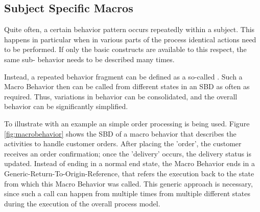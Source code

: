 


\subsection{Subject Specific Macros}

Quite often, a certain behavior pattern occurs repeatedly within a subject. This happens in particular when in various parts of the process identical actions need to be performed. If only the basic constructs are available to this respect, the same sub- behavior needs to be described many times.

Instead, a repeated behavior fragment can be defined as a so-called . Such a Macro Behavior then can be called from different states in an SBD as often as required. Thus, variations in behavior can be consolidated, and the overall behavior can be significantly simplified.

To illustrate with an example an simple order processing is being used. Figure \ref{fig:macrobehavior} shows the SBD of a macro behavior that describes the activities to handle customer orders. After placing the 'order', the customer receives an order confirmation; once the 'delivery' occurs, the delivery status is updated. Instead of ending in a normal end state, the Macro Behavior ends in a Generic-Return-To-Origin-Reference, that refers the execution back to the state from which this Macro Behavior was called. This generic approach is necessary, since such a call can happen from multiple times from multiple different states during the execution of the overall process model. 

